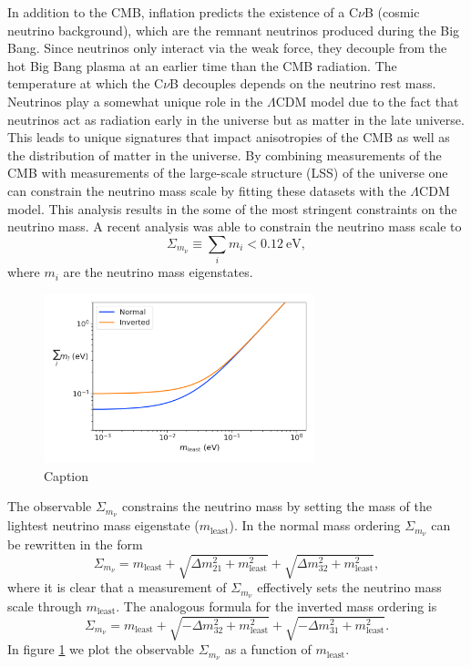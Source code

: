 In addition to the CMB, inflation predicts the existence of a C$\nu$B (cosmic neutrino background), which are the remnant neutrinos produced during the Big Bang. Since neutrinos only interact via the weak force, they decouple from the hot Big Bang plasma at an earlier time than the CMB radiation. The temperature at which the C$\nu$B decouples depends on the neutrino rest mass. Neutrinos play a somewhat unique role in the $\Lambda$CDM model due to the fact that neutrinos act as radiation early in the universe but as matter in the late universe. This leads to unique signatures that impact anisotropies of the CMB as well as the distribution of matter in the universe. By combining measurements of the CMB with measurements of the large-scale structure (LSS) of the universe one can constrain the neutrino mass scale by fitting these datasets with the $\Lambda$CDM model. This analysis results in the some of the most stringent constraints on the neutrino mass. A recent analysis was able to constrain the neutrino mass scale to
\begin{equation}
     \Sigma_{m_\nu} \equiv \sum_{i}m_i<0.12~\mathrm{eV},
\end{equation}
where $m_i$ are the neutrino mass eigenstates. 

\begin{figure}[htbp]
    \centering
    \includegraphics[width=0.7\textwidth]{figs/Chapter-2/230301_cosmology_nu_mass_observable.png}
    \caption{Caption}
    \label{fig:chap2-nu-mass-cosmo}
\end{figure}

The observable $\Sigma_{m_\nu}$ constrains the neutrino mass by setting the mass of the lightest neutrino mass eigenstate ($m_\mathrm{least}$). In the normal mass ordering $\Sigma_{m_\nu}$ can be rewritten in the form 
\begin{equation}
    \Sigma_{m_\nu} = m_\mathrm{least} + \sqrt{\Delta m_{21}^2+m_\mathrm{least}^2}+\sqrt{\Delta m_{32}^2+m_\mathrm{least}^2},
\end{equation}
where it is clear that a measurement of $\Sigma_{m_\nu}$ effectively sets the neutrino mass scale through $m_\mathrm{least}$. The analogous formula for the inverted mass ordering is 
\begin{equation}
    \Sigma_{m_\nu} = m_\mathrm{least}+\sqrt{-\Delta m_{32}^2+m_\mathrm{least}^2}+\sqrt{-\Delta m_{31}^2+m_\mathrm{least}^2}.
\end{equation}
In figure \ref{fig:chap2-nu-mass-cosmo} we plot the observable $\Sigma_{m_\nu}$ as a function of $m_\mathrm{least}$.

